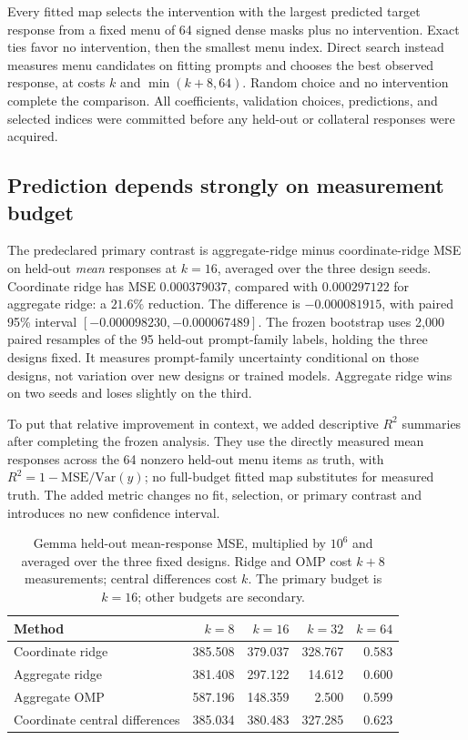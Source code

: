 Every fitted map selects the intervention with the largest predicted target response from a fixed menu of 64 signed dense masks plus no intervention. Exact ties favor no intervention, then the smallest menu index. Direct search instead measures menu candidates on fitting prompts and chooses the best observed response, at costs $k$ and $\min(k+8,64)$. Random choice and no intervention complete the comparison. All coefficients, validation choices, predictions, and selected indices were committed before any held-out or collateral responses were acquired.

\subsection{Prediction depends strongly on measurement budget}

The predeclared primary contrast is aggregate-ridge minus coordinate-ridge MSE on held-out \emph{mean} responses at $k=16$, averaged over the three design seeds. Coordinate ridge has MSE $0.000379037$, compared with $0.000297122$ for aggregate ridge: a $21.6\%$ reduction. The difference is $-0.000081915$, with paired 95\% interval $[-0.000098230,-0.000067489]$. The frozen bootstrap uses 2,000 paired resamples of the 95 held-out prompt-family labels, holding the three designs fixed. It measures prompt-family uncertainty conditional on those designs, not variation over new designs or trained models. Aggregate ridge wins on two seeds and loses slightly on the third.

To put that relative improvement in context, we added descriptive $R^2$ summaries after completing the frozen analysis. They use the directly measured mean responses across the 64 nonzero held-out menu items as truth, with $R^2=1-\mathrm{MSE}/\mathrm{Var}(y)$; no full-budget fitted map substitutes for measured truth. The added metric changes no fit, selection, or primary contrast and introduces no new confidence interval.

\begin{table}[t]
\centering
\begin{tabular}{lrrrr}
\toprule
Method & $k=8$ & $k=16$ & $k=32$ & $k=64$ \\
\midrule
Coordinate ridge & 385.508 & 379.037 & 328.767 & 0.583 \\
Aggregate ridge & 381.408 & 297.122 & 14.612 & 0.600 \\
Aggregate OMP & 587.196 & 148.359 & 2.500 & 0.599 \\
Coordinate central differences & 385.034 & 380.483 & 327.285 & 0.623 \\
\bottomrule
\end{tabular}
\caption{Gemma held-out mean-response MSE, multiplied by $10^6$ and averaged over the three fixed designs. Ridge and OMP cost $k+8$ measurements; central differences cost $k$. The primary budget is $k=16$; other budgets are secondary.}
\label{tab:gemma-mse}
\end{table}

